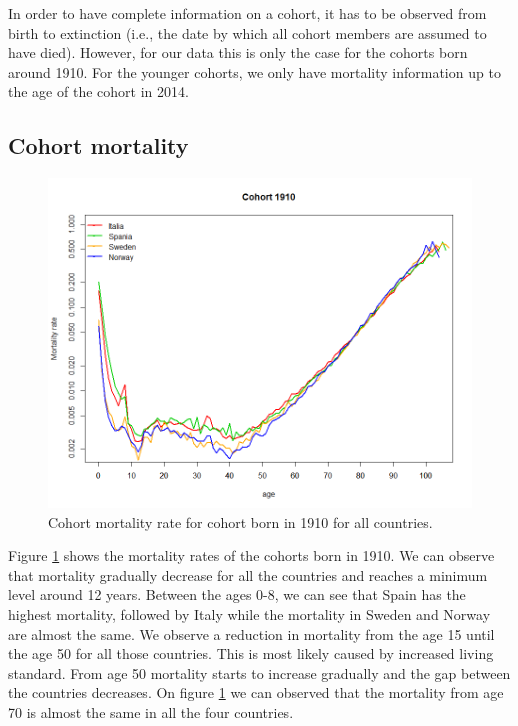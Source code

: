 In order to have complete information on a cohort, it has to be observed from birth to extinction (i.e., the date by which all cohort members are assumed to have died).
However, for our data this is only the case for the cohorts born around 1910.
For the younger cohorts, we only have mortality information up to the age of the cohort in 2014.


\subsection{Cohort mortality}            
            
            
              
          \begin{figure}[tbh]
             \centering
              \includegraphics[width=0.8\linewidth]{figures/cohortMortalityRate_allCountries1910.png}
              \caption{Cohort mortality rate for cohort born in 1910 for all countries.}
              \label{fig:CohortMortality 1910}
            \end{figure} 
  
Figure \ref{fig:CohortMortality 1910} shows the mortality rates of the cohorts born in 1910.
We can observe that mortality gradually decrease for all the countries and reaches a minimum level around 12 years.
Between the ages 0-8, we can see that Spain has the highest mortality, followed by Italy while the mortality in Sweden and Norway are almost the same.
We observe a reduction in mortality from the age 15 until the age 50 for all those countries.
This is most likely caused by increased living standard.
From age 50 mortality starts to increase gradually and the gap between the countries decreases.
On figure \ref{fig:CohortMortality 1910} we can observed that the mortality from age 70 is almost the same in all the four countries.
            
